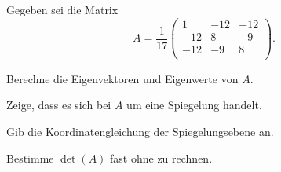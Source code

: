 \documentclass[%
11pt,%
twoside,%
titlepage,%
german,%
headsepline%
]{scrartcl}
\begin{document}
\begin{ueb}
Gegeben sei die Matrix
$$A=\frac{1}{17}
\begin{pmatrix}
1&-12&-12\\
-12&8&-9\\
-12&-9&8\\
\end{pmatrix}.$$

\begin{enumeratea}
\item Berechne die Eigenvektoren und Eigenwerte von $A$.
\item Zeige, dass es sich bei $A$ um eine Spiegelung handelt.
\item Gib die Koordinatengleichung der Spiegelungsebene an.
\item Bestimme $\det(A)$ fast ohne zu rechnen.
\end{enumeratea}
\end{ueb}

\cleardoublepage
\listoffigures
\listoftables
%
%
\end{document}
